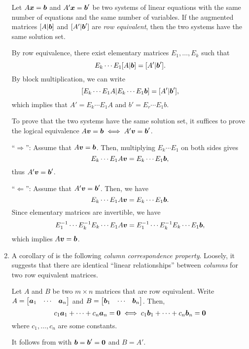 \begin{enumerate}
\begin{theorem}
\label{thm:row-equiv-same-sol}
Let \(A\vb*{x}=\vb*{b}\) and \(A'\vb*{x}=\vb*{b}'\) be two systems of
linear equations with the same number of equations and the same number of
variables. If the augmented matrices \([A|\vb*{b}]\) and \([A'|\vb*{b}']\) are
\emph{row equivalent}, then the two systems have the same solution set.
\end{theorem}
\begin{pf}
By row equivalence, there exist elementary matrices \(E_1,\dotsc,E_k\) such
that
\[
E_k\dotsb E_1[A|\vb*{b}]=[A'|\vb*{b}'].
\]
By block multiplication, we can write
\[
[E_k\dotsb E_1A|E_k\dotsb E_1\vb*{b}]=[A'|\vb*{b}'],
\]
which implies that \(A'=E_{k}\dotsb E_1A\) and \(b'=E_{r}\dotsb E_1b\).

To prove that the two systems have the same solution set, it suffices to prove
the logical equivalence \(A\vb*{v}=\vb*{b}\iff A'\vb*{v}=\vb*{b}'\).

``\(\Rightarrow\)'': Assume that \(A\vb*{v}=\vb*{b}\). Then, multiplying
\(E_k\dotsb E_1\) on both sides gives
\[
E_{k}\dotsb E_1A\vb*{v}=E_{k}\dotsb E_1\vb*{b},
\]
thus \(A'\vb*{v}=\vb*{b}'\).

``\(\Leftarrow\)'': Assume that \(A'\vb*{v}=\vb*{b}'\). Then, we have
\[
E_{k}\dotsb E_1A\vb*{v}=E_{k}\dotsb E_1\vb*{b}.
\]
Since elementary matrices are invertible, we have
\[
E_{1}^{-1}\dotsb E_{k}^{-1}E_{k}\dotsb E_1A\vb*{v}=E_{1}^{-1}\dotsb E_{k}^{-1}E_{k}\dotsb E_1\vb*{b},
\]
which implies \(A\vb*{v}=\vb*{b}\).
\end{pf}

\item A corollary of  is the following
\emph{column correspondence property}. Loosely, it suggests that there are
identical ``linear relationships'' between \emph{columns} for two row
equivalent matrices.

\begin{corollary}
\label{cor:col-correspond}
Let \(A\) and \(B\) be two \(m\times n\) matrices that are row equivalent.
Write \(A=\mqty[\vect{a}_{1}&\cdots&\vect{a}_{n}]\) and
\(B=\mqty[\vect{b}_{1}&\cdots&\vect{b}_{n}]\). Then,
\[
c_1\vb*{a}_{1}+\dotsb+c_n\vb*{a}_{n}=\vb*{0}\iff
c_1\vb*{b}_{1}+\dotsb+c_n\vb*{b}_{n}=\vb*{0}
\]
where \(c_1,\dotsc,c_n\) are some constants.
\end{corollary}
\begin{pf}
It follows from  with
\(\vb*{b}=\vb*{b}'=\vb*{0}\) and \(B=A'\).
\end{pf}


\end{enumerate}
